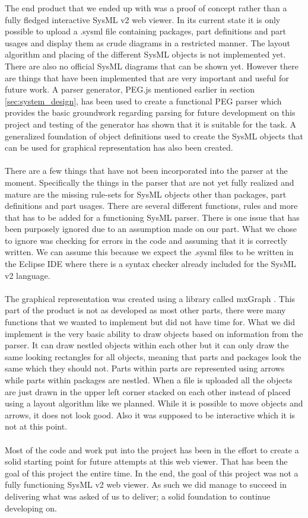 \documentclass{article}
\begin{document}
The end product that we ended up with was a proof of concept rather than a fully fledged interactive SysML v2 web viewer. In its current state it is only possible to upload a .sysml file containing packages, part definitions and part usages and display them as crude diagrams in a restricted manner. The layout algorithm and placing of the different SysML objects is not implemented yet. There are also no official SysML diagrams that can be shown yet. However there are things that have been implemented that are very important and useful for future work. A parser generator, PEG.js mentioned earlier in section \ref{sec:system_design}, has been used to create a functional PEG parser which provides the basic groundwork regarding parsing for future development on this project and testing of the generator has shown that it is suitable for the task. A generalized foundation of object definitions used to create the SysML objects that can be used for graphical representation has also been created. 
\\\\
There are a few things that have not been incorporated into the parser at the moment. Specifically the things in the parser that are not yet fully realized and mature are the missing rule-sets for SysML objects other than packages, part definitions and part usages. There are several different functions, rules and more that has to be added for a functioning SysML parser. There is one issue that has been purposely ignored due to an assumption made on our part. What we chose to ignore was checking for errors in the code and assuming that it is correctly written. We can assume this because we expect the .sysml files to be written in the Eclipse IDE \cite{eclipseIDE} where there is a syntax checker already included for the SysML v2 language. 
\\\\
The graphical representation was created using a library called mxGraph \cite{mxGraph}. This part of the product is not as developed as most other parts, there were many functions that we wanted to implement but did not have time for. What we did implement is the very basic ability to draw objects based on information from the parser. It can draw nestled objects within each other but it can only draw the same looking rectangles for all objects, meaning that parts and packages look the same which they should not. Parts within parts are represented using arrows while parts within packages are nestled. When a file is uploaded all the objects are just drawn in the upper left corner stacked on each other instead of placed using a layout algorithm like we planned. While it is possible to move objects and arrows, it does not look good. Also it was supposed to be interactive which it is not at this point. 
\\\\
Most of the code and work put into the project has been in the effort to create a solid starting point for future attempts at this web viewer. That has been the goal of this project the entire time. In the end, the goal of this project was not a fully functioning SysML v2 web viewer. As such we did manage to succeed in delivering what was asked of us to deliver; a solid foundation to continue developing on. 
\end{document}
